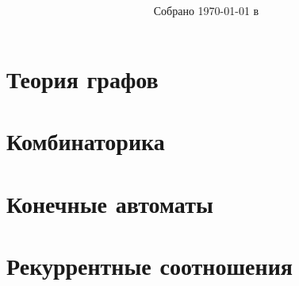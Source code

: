 \documentclass[a4paper]{article}
\title{\huge \textbf{\papertitle}}
\author{\paperauthors}
\date{Собрано {\ddmmyyyydate\today} в \currenttime}
\begin{document}
  
  

  \section{Теория графов}
  
  
  
  
  
  
  
  
  
  
  
  
  
  
  
  

  \section{Комбинаторика}
  
  
  
  
  
  
  

  \section{Конечные автоматы}
  
  
  
  
  
  
  
  

  \section{Рекуррентные соотношения}
  
  
  
  
  
  
\end{document}
